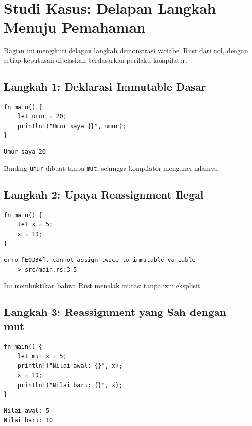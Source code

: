 \documentclass[11pt,a4paper]{article}
\begin{document}
\section{Studi Kasus: Delapan Langkah Menuju Pemahaman}

Bagian ini mengikuti delapan langkah demonstrasi variabel Rust dari nol, dengan setiap keputusan dijelaskan berdasarkan perilaku kompilator.

\subsection{Langkah 1: Deklarasi Immutable Dasar}

\begin{lstlisting}[style=code]
fn main() {
    let umur = 20;
    println!("Umur saya {}", umur);
}
\end{lstlisting}

\begin{lstlisting}[style=out]
Umur saya 20
\end{lstlisting}

Binding \texttt{umur} dibuat tanpa \texttt{mut}, sehingga kompilator mengunci nilainya.

\subsection{Langkah 2: Upaya Reassignment Ilegal}

\begin{lstlisting}[style=code]
fn main() {
    let x = 5;
    x = 10;
}
\end{lstlisting}

\begin{lstlisting}[style=out]
error[E0384]: cannot assign twice to immutable variable
  --> src/main.rs:3:5
\end{lstlisting}

Ini membuktikan bahwa Rust menolak mutasi tanpa izin eksplisit.

\subsection{Langkah 3: Reassignment yang Sah dengan mut}

\begin{lstlisting}[style=code]
fn main() {
    let mut x = 5;
    println!("Nilai awal: {}", x);
    x = 10;
    println!("Nilai baru: {}", x);
}
\end{lstlisting}

\begin{lstlisting}[style=out]
Nilai awal: 5
Nilai baru: 10
\end{lstlisting}
\end{document}
